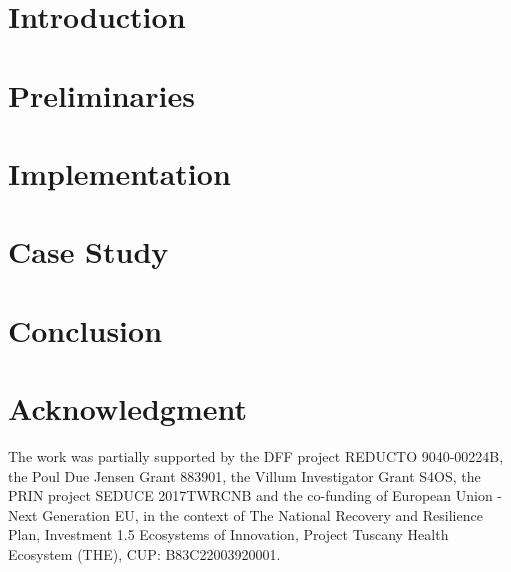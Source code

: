 \documentclass[a4paper,american]{llncs}
\begin{document}
\begin{abstract}
	
\end{abstract}



\section{Introduction}\label{sec_intro}




\section{Preliminaries}\label{sec_pre}




\section{Implementation}\label{sec_imp}





\section{Case Study}\label{sec_eval}





\section{Conclusion}\label{sec_conc}




\section*{Acknowledgment}
The work was partially supported by the DFF project REDUCTO 9040-00224B, the Poul Due Jensen Grant 883901, the Villum Investigator Grant S4OS, the PRIN project SEDUCE 2017TWRCNB and the co-funding of European Union - Next Generation EU, in the context of The National Recovery and Resilience Plan, Investment 1.5 Ecosystems of Innovation, Project Tuscany Health Ecosystem (THE), CUP: B83C22003920001.







\appendix
%

\end{document}

